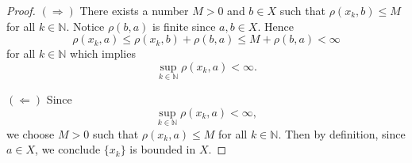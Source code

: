 \begin{Exercise}
\begin{proof}
$(\Longrightarrow)$
There exists a number $M>0$ and $b\in X$ such that $\rho(x_k, b) \leq M$ for all $k\in\mathbb{N}$. Notice $\rho(b, a)$ is finite since $a, b\in X$. Hence
$$
\rho(x_k,a) 
\leq \rho(x_k,b) + \rho(b,a) 
\leq M + \rho(b,a) < \infty
$$ 
for all $k\in\mathbb{N}$ which implies $$
\sup_{k\in\mathbb{N}}\rho(x_k,a) 
< \infty.
$$

\vspace{2ex}

$(\Longleftarrow)$
Since 
$$
\sup_{k\in\mathbb{N}}\rho(x_k,a) < \infty,
$$ 
we choose $M>0$ such that $\rho(x_k,a) \leq M$ for all $k\in\mathbb{N}$. Then by definition, since $a\in X$, we conclude $\{x_k\} $ is bounded in $X$.
\end{proof}
\end{Exercise}